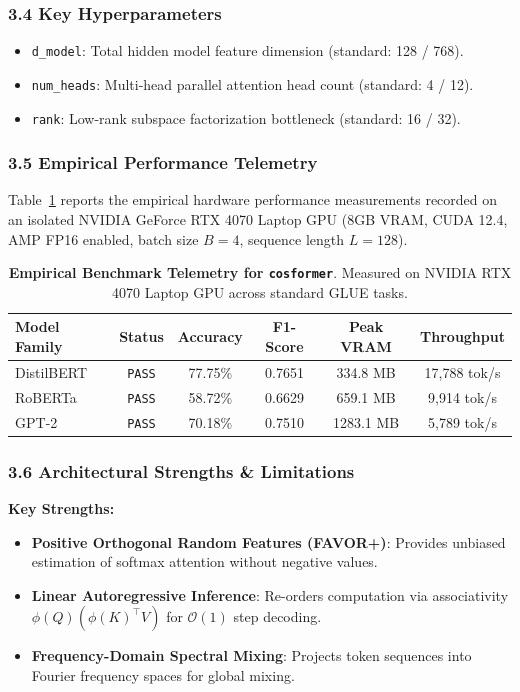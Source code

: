 \subsubsection*{3.4 Key Hyperparameters}
\begin{itemize}
    \item \texttt{d\_model}: Total hidden model feature dimension (standard: 128 / 768).
    \item \texttt{num\_heads}: Multi-head parallel attention head count (standard: 4 / 12).
    \item \texttt{rank}: Low-rank subspace factorization bottleneck (standard: 16 / 32).
\end{itemize}

\subsubsection*{3.5 Empirical Performance Telemetry}
Table~\ref{tab:telemetry_cosformer} reports the empirical hardware performance measurements recorded on an isolated NVIDIA GeForce RTX 4070 Laptop GPU (8GB VRAM, CUDA 12.4, AMP FP16 enabled, batch size $B=4$, sequence length $L=128$).

\begin{table}[h]
\centering
\small
\caption{\textbf{Empirical Benchmark Telemetry for \texttt{cosformer}}. Measured on NVIDIA RTX 4070 Laptop GPU across standard GLUE tasks.}
\label{tab:telemetry_cosformer}
\begin{tabular*}{\columnwidth}{@{\extracolsep{\fill}}lccccc}
\toprule
\textbf{Model Family} & \textbf{Status} & \textbf{Accuracy} & \textbf{F1-Score} & \textbf{Peak VRAM} & \textbf{Throughput} \\
\midrule
DistilBERT & \texttt{PASS} & 77.75\% & 0.7651 & 334.8 MB & 17,788 tok/s \\
RoBERTa & \texttt{PASS} & 58.72\% & 0.6629 & 659.1 MB & 9,914 tok/s \\
GPT-2 & \texttt{PASS} & 70.18\% & 0.7510 & 1283.1 MB & 5,789 tok/s \\
\bottomrule
\end{tabular*}
\end{table}

\subsubsection*{3.6 Architectural Strengths \& Limitations}
\textbf{Key Strengths:}
\begin{itemize}
    \item \textbf{Positive Orthogonal Random Features (FAVOR+)}: Provides unbiased estimation of softmax attention without negative values.
    \item \textbf{Linear Autoregressive Inference}: Re-orders computation via associativity $\phi(Q) (\phi(K)^\top V)$ for $\mathcal{O}(1)$ step decoding.
    \item \textbf{Frequency-Domain Spectral Mixing}: Projects token sequences into Fourier frequency spaces for global mixing.
\end{itemize}

